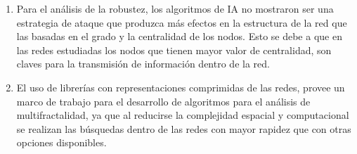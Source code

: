 \begin{enumerate}
    \item Para el análisis de la robustez, los algoritmos de IA no mostraron ser una estrategia de ataque que produzca más efectos en la estructura de la red que las basadas en el grado y la centralidad de los nodos. Esto se debe a que en las redes estudiadas los nodos que tienen mayor valor de centralidad, son claves para la transmisión de información dentro de la red.
    \item El uso de librerías con representaciones comprimidas de las redes, provee un marco de trabajo para el desarrollo de algoritmos para el análisis de multifractalidad, ya que al reducirse la complejidad espacial y computacional se realizan las búsquedas dentro de las redes con mayor rapidez que con otras opciones disponibles.
\end{enumerate}